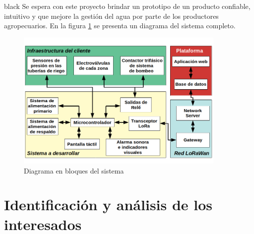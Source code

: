 \documentclass[11pt]{charter}
\begin{document}
\begin{consigna}{black}
Se espera con este proyecto brindar un prototipo de un producto confiable, intuitivo y que mejore la gestión del agua por parte de los productores agropecuarios. En la figura \ref{fig:diagBloques} se presenta un diagrama del sistema completo.


\vspace{25px}

\begin{figure}[htpb]
\centering 
\includegraphics[width=0.9\textwidth]{./Figuras/DiagramaBloques.png}
\caption{Diagrama en bloques del sistema}

\label{fig:diagBloques}
\end{figure}

\vspace{25px}

\end{consigna}


\section{Identificación y análisis de los interesados}
\label{sec:interesados}
\end{document}
